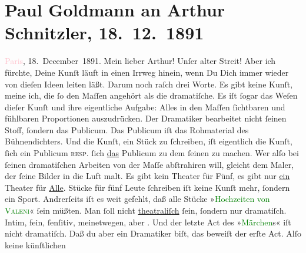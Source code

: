 

               \section[Paul Goldmann an Arthur Schnitzler, 18. 12. 1891]{ Paul Goldmann an Arthur Schnitzler, 18. 12. 1891}\nopagebreak{}\rehead{ }\normalsize\beginnumbering{} \toendnotes[C]{\smallbreak\pagebreak[2]} 
\toendnotes[C]{\smallbreak}\pstart
           \raggedleft{}{\pb}\textcolor{pink}{Paris}{}\ledrightnote{\textcolor{pink}{Paris}}, 18. December 1891.\pend
           \pstart\center{}Mein lieber Arthur!\pend\pstart
           Unſer alter Streit! Aber ich fürchte, Deine Kunſt läuft in einen Irrweg hinein, wenn
               Du Dich immer wieder von dieſen Ideen leiten läßt. Darum noch raſch drei Worte. Es
               gibt keine Kunſt, meine ich, die ſo  den Maſſen angehört als die dramatiſche. Es iſt ſogar das Weſen dieſer Kunſt
               und ihre eigentliche Aufgabe: Alles in den Maſſen ſichtbaren und fühlbaren
               Proportionen auszudrücken. Der Dramatiker bearbeitet nicht ſeinen Stoff, ſondern das
               Publicum. Das Publicum iſt das Rohmaterial des Bühnendichters. Und die Kunſt, ein
               Stück zu ſchreiben, iſt eigentlich die Kunſt, ſich ein Publicum \textsc{resp.} ſich \uline{das} Publicum {\pb}zu dem ſeinen zu machen. Wer alſo bei ſeinen
               dramatiſchen Arbeiten von der Maſſe abſtrahiren will, gleicht dem Maler, der ſeine
               Bilder in die Luft malt. Es gibt kein Theater für Fünf, es gibt nur \uline{ein} Theater für \uline{Alle}.
               Stücke für fünf Leute ſchreiben iſt keine Kunſt mehr, ſondern ein Sport. Andrerſeits
               iſt es weit gefehlt, daß alle Stücke »\textcolor{green}{Hochzeiten von
                     \textsc{Valeni}}{}\ledrightnote{\textcolor{green}{Die Hochzeit von Valeni}}« ſein müßten. Man ſoll nicht \uline{theatraliſch} ſein,
               ſondern nur dramatiſch. Intim, fein, ſenſitiv, meinetwegen, aber . Und der letzte Act des »\textcolor{green}{Märchen}{}\ledrightnote{\textcolor{green}{Das Märchen. Schauspiel in drei Aufzügen}}s« iſt nicht dramatiſch. Daß du aber ein Dramatiker biſt, {\pb}das beweiſt der erſte Act. Alſo keine künſtlichen
